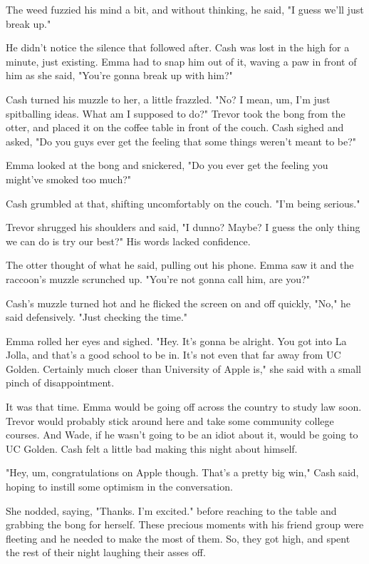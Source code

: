 The weed fuzzied his mind a bit, and without thinking, he said, "I guess we'll just break up."

He didn't notice the silence that followed after. Cash was lost in the high for a minute, just existing. Emma had to snap him out of it, waving a paw in front of him as she said, "You're gonna break up with him?"

Cash turned his muzzle to her, a little frazzled. "No? I mean, um, I'm just spitballing ideas. What am I supposed to do?" Trevor took the bong from the otter, and placed it on the coffee table in front of the couch. Cash sighed and asked, "Do you guys ever get the feeling that some things weren't meant to be?"

Emma looked at the bong and snickered, "Do you ever get the feeling you might've smoked too much?"

Cash grumbled at that, shifting uncomfortably on the couch. "I'm being serious."

Trevor shrugged his shoulders and said, "I dunno? Maybe? I guess the only thing we can do is try our best?" His words lacked confidence.

The otter thought of what he said, pulling out his phone. Emma saw it and the raccoon's muzzle scrunched up. "You're not gonna call him, are you?"

Cash's muzzle turned hot and he flicked the screen on and off quickly, "No," he said defensively. "Just checking the time."

Emma rolled her eyes and sighed. "Hey. It's gonna be alright. You got into La Jolla, and that's a good school to be in. It's not even that far away from UC Golden. Certainly much closer than University of Apple is," she said with a small pinch of disappointment.

It was that time. Emma would be going off across the country to study law soon. Trevor would probably stick around here and take some community college courses. And Wade, if he wasn't going to be an idiot about it, would be going to UC Golden. Cash felt a little bad making this night about himself.

"Hey, um, congratulations on Apple though. That's a pretty big win," Cash said, hoping to instill some optimism in the conversation.

She nodded, saying, "Thanks. I'm excited." before reaching to the table and grabbing the bong for herself. These precious moments with his friend group were fleeting and he needed to make the most of them. So, they got high, and spent the rest of their night laughing their asses off.

